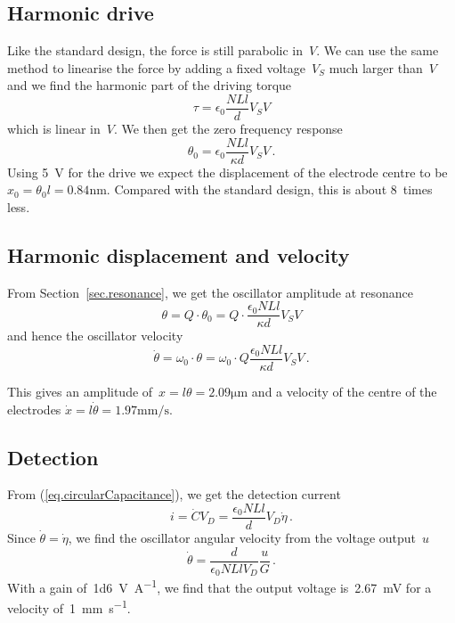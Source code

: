 \subsection{Harmonic drive}
Like the standard design, the force is still parabolic in~$V$. We can use the same method to linearise the force by adding a fixed voltage~$V_S$ much larger than~$V$ and we find the harmonic part of the driving torque
\begin{equation}
\label{Eq.drivetorque}
\tau = \epsilon_0\frac{NLl}{d}V_S V
\end{equation}
which is linear in~$V$. We then get the zero frequency response
\begin{equation}
	\theta_0 = \epsilon_0 \frac{N L l}{\kappa d} V_S V \,.
\end{equation}
Using \si{\num{5}\volt} for the drive we expect the displacement of the electrode centre to be $x_0 = \theta_0 l = \si{\num{0.84}\nano\meter}$. Compared with the standard design, this is about 8~times less.

\subsection{Harmonic displacement and velocity}
 From Section~\ref{sec.resonance}, we get the oscillator amplitude at resonance
\begin{equation}
\theta = Q \cdot \theta_0 = Q \cdot \frac{\epsilon_0 N L l}{\kappa d} V_S V
\end{equation}
and hence the oscillator velocity
\begin{equation}
\label{Eq.circularvelocity}
\dot\theta
= \omega_0 \cdot \theta
= \omega_0 \cdot Q \frac{\epsilon_0 N L l}{\kappa d} V_S V \,.
\end{equation}

This gives an amplitude of~$x = l \theta = \si{\num{2.09}\micro\meter}$ and a velocity of the centre of the electrodes ${\dot x} = l {\dot \theta} = \si{\num{1.97}\milli\meter\per\second}$.

\subsection{Detection}
From (\ref{eq.circularCapacitance}), we get the detection current
\begin{equation}
i = \dot C V_D = \frac{\epsilon_0 N L l}{d} V_D \dot\eta \,.
\end{equation}
Since ${\dot \theta} = {\dot \eta}$, we find the oscillator angular velocity from the voltage output~$u$
\begin{equation}
\dot \theta = \frac{d}{\epsilon_0 N L l V_D} \frac{u}{G} \,.
\label{eq.ThetaDotFromSignal}
\end{equation}
With a gain of~\si{\num{1d6}\volt\per\ampere}, we find that the output voltage is~\si{\num{2.67}\milli\volt} for a velocity of~\si{\num{1}\milli\meter\per\second}.

